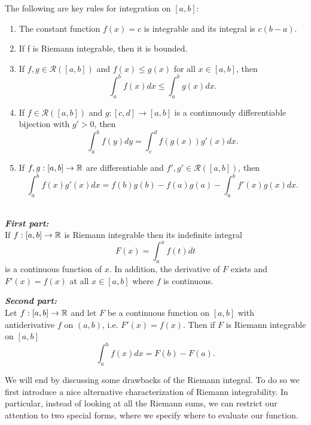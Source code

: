 \documentclass{article}
\begin{document}
\begin{proposition}
The following are key rules for integration on $[a,b]$:
\begin{enumerate}
    \item The constant function $f(x) = c$ is integrable and its integral is $c(b-a)$.
    \item If f is Riemann integrable, then it is bounded.
    \item If $f,g \in \mathcal{R}([a,b])$ and $f(x) \leq g(x)$ for all $x \in [a,b]$, then
    $$ \int_a^b f(x) dx \leq  \int_a^b g(x) dx.$$
    \item If $f \in \mathcal{R}([a,b])$ and $g:[c,d] \to [a,b]$ is a continuously differentiable bijection with $g'>0$, then 
     $$ \int_a^b f(y) dy =  \int_c^d f(g(x)) g'(x) dx.$$
     \item If $f,g : [a,b] \to {\mathbb{R}}$ are differentiable and $f',g' \in \mathcal{R}([a,b])$, then 
     $$ \int_a^b f(x) g'(x) dx =  f(b) g(b) - f(a) g(a) - \int_a^b f'(x) g(x) dx.$$
\end{enumerate}
\end{proposition}


\begin{theorem} \textcolor{white}{skip} \\
\textbf{\emph{First part:}}\\
If $f:[a,b] \to {\mathbb{R}}$ is Riemann integrable then its indefinite integral
$$ F(x) = \int_a^x f(t) dt$$
is a continuous function of $x$. In addition, the derivative of $F$ exists and $F'(x) = f(x)$ at all $x \in [a,b]$ where $f$ is continuous.

\textbf{\emph{Second part:}}\\
Let $f:[a,b]\to {\mathbb{R}}$ and let $F$ be a continuous function on $[a,b]$ with antiderivative $f$ on $(a,b)$, i.e. $F'(x) = f(x)$. Then if $F$ is Riemann integrable on $[a,b]$
$$ \int_a^b f(x) dx = F(b) - F(a).$$
\end{theorem}

We will end by discussing some drawbacks of the Riemann integral. To do so we first introduce a nice alternative characterization of Riemann integrability. In particular, instead of looking at all the Riemann sums, we can restrict our attention to two special forms, where we specify where to evaluate our function. 
\end{document}
